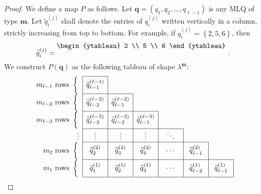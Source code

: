 \documentclass[reqno]{amsart}
\newcommand{\0}{\phantom{c}}
\newcommand{\mm}{\mathbf{m}}
\newcommand{\qq}{\mathbf{q}}
\newcommand{\set}[1]{\left\{ #1 \right\}}
\newcommand{\tup}[1]{\left( #1 \right)}
\theoremstyle{plain}
\theoremstyle{definition}
\numberwithin{equation}{section}
\begin{document}
\begin{proof}
We define a map $P$ as follows.
Let $\qq = \tup{q_1, q_2, \dotsc, q_{\ell-1}}$ is any MLQ of type $\mm$.
Let $\widetilde{q}_i^{(j)}$ shall denote the entries of $q_i^{(j)}$ written vertically in a column, strictly increasing from top to bottom.
For example, if $q_i^{(j)} = \set{2,5,6}$, then
\[
\widetilde{q}_i^{(j)} = \raisebox{10pt}{$\begin{ytableau} 2 \\ 5 \\ 6 \end{ytableau}$}\ .
\]
We construct $P(\qq)$ as the following tableau of shape $\lambda^{\mm}$:
\begin{equation}
\label{pf.lem:determinant_form.bij1.visual}
\begin{array}[c]{r|c|ccc@{\hspace{30pt}}c@{\hspace{35pt}}c@{\hspace{35pt}}}
\cline{2-2}%
m_{\ell-1} \text{ rows } \left\{ \vphantom{\dfrac{2^2}{2^2}}\right.
    & \widetilde{q}_{\ell-1}^{(\ell-1)} &  &  &  &  & \\\cline{2-3}
m_{\ell-2} \text{ rows } \left\{ \vphantom{\dfrac{2^2}{2^2}}\right.
    & \widetilde{q}_{\ell-2}^{(\ell-2)} & \widetilde{q}_{\ell-1}^{(\ell-2)} & \multicolumn{1}{|c}{} &  &  & \\\cline{2-4}
m_{\ell-3} \text{ rows } \left\{  \vphantom{\dfrac{2^2}{2^2}}\right.
    & \widetilde{q}_{\ell-3}^{(\ell-3)} & \widetilde{q}_{\ell-2}^{(\ell-3)} & \multicolumn{1}{|c}{\widetilde{q}_{\ell-1}^{(  \ell-3)}} & \multicolumn{1}{|c}{} &  & \\\cline{2-5}%
\vdots & \mathbf{\vdots} & \mathbf{\vdots} & \multicolumn{1}{|c}{\vdots} & \multicolumn{1}{|c|}{\ddots} &  & \\\cline{2-6}
m_2 \text{ rows } \left\{  \vphantom{\dfrac{2^2}{2^2}}\right.
    & \widetilde{q}_2^{(2)} & \widetilde{q}_{3}^{(2)} & \multicolumn{1}{|c}{\widetilde{q}_{4}^{(2)}} & \multicolumn{1}{|c}{\cdots} & \multicolumn{1}{|c}{\widetilde{q}_{\ell-1}^{(2)}} & \multicolumn{1}{|c}{}\\\cline{2-7}
m_1 \text{ rows } \left\{ \vphantom{\dfrac{2^2}{2^2}}\right.
    & \widetilde{q}_1^{(1)} & \widetilde{q}_2^{(1)} & \multicolumn{1}{|c}{\widetilde{q}_{3}^{(1)}} & \multicolumn{1}{|c}{\cdots} & \multicolumn{1}{|c}{\widetilde{q}_{\ell-2}^{(1)}} & \multicolumn{1}{|c|}{\widetilde{q}_{\ell-1}^{(1)}}\\\cline{2-7}
\end{array}

\end{equation}
\end{proof}
\end{document}
